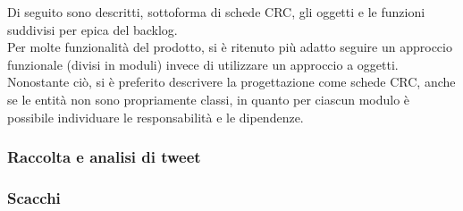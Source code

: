 Di seguito sono descritti, sottoforma di schede CRC, gli oggetti e le funzioni suddivisi per epica del backlog.\\
Per molte funzionalità del prodotto, si è ritenuto più adatto seguire un approccio funzionale (divisi in moduli) invece di utilizzare un approccio a oggetti.\\
Nonostante ciò, si è preferito descrivere la progettazione come schede CRC, anche se le entità non sono propriamente classi,
in quanto per ciascun modulo è possibile individuare le responsabilità e le dipendenze.

\subsubsection*{Raccolta e analisi di tweet}








\subsubsection*{Scacchi}

